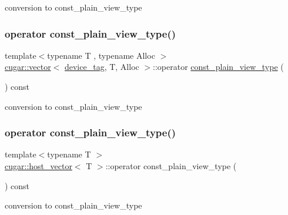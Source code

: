 conversion to const\+\_\+plain\+\_\+view\+\_\+type \mbox{\label{group___basic_gaeb5b6b16b7efd8be40fe5c410c95b53e}} 
\subsubsection{\texorpdfstring{operator const\+\_\+plain\+\_\+view\+\_\+type()}{operator const\_plain\_view\_type()}\hspace{0.1cm}{\footnotesize\ttfamily [2/5]}}
{\footnotesize\ttfamily template$<$typename T , typename Alloc $>$ \\
\hyperlink{structcugar_1_1vector}{cugar\+::vector}$<$ \hyperlink{structcugar_1_1device__tag}{device\+\_\+tag}, T, Alloc $>$\+::operator \hyperlink{structcugar_1_1vector__view}{const\+\_\+plain\+\_\+view\+\_\+type} (\begin{DoxyParamCaption}{ }\end{DoxyParamCaption}) const\hspace{0.3cm}{\ttfamily [inline]}}

conversion to const\+\_\+plain\+\_\+view\+\_\+type \mbox{\label{group___basic_ga4b49363d011f3360acad5d64fad398cb}} 
\subsubsection{\texorpdfstring{operator const\+\_\+plain\+\_\+view\+\_\+type()}{operator const\_plain\_view\_type()}\hspace{0.1cm}{\footnotesize\ttfamily [3/5]}}
{\footnotesize\ttfamily template$<$typename T $>$ \\
\hyperlink{structcugar_1_1host__vector}{cugar\+::host\+\_\+vector}$<$ T $>$\+::operator const\+\_\+plain\+\_\+view\+\_\+type (\begin{DoxyParamCaption}{ }\end{DoxyParamCaption}) const\hspace{0.3cm}{\ttfamily [inline]}}

conversion to const\+\_\+plain\+\_\+view\+\_\+type \mbox{\label{group___basic_ga86ea65d4863bb5e1ed5da63e6355672f}} 
